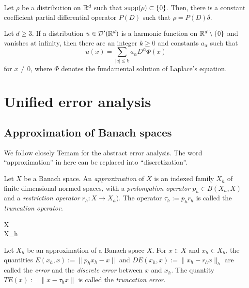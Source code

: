 \documentclass[a4paper]{article}
\begin{document}
\begin{lem*}
Let $\rho$ be a distribution on $\mathbb{R}^d$ such that $\operatorname{supp}(\rho)\subset\{0\}$.
Then, there is a constant coefficient partial differential operator $P(D)$ such that $\rho=P(D)\delta$.
\end{lem*}

\begin{cor*}
Let $d\ge3$.
If a distribution $u\in\mathcal{D}'(\mathbb{R}^d)$ is a harmonic function on $\mathbb{R}^d\setminus\{0\}$ and vanishes at infinity, then there are an integer $k\ge0$ and constants $a_\alpha$ such that
\[u(x)=\sum_{|a|\le k}a_\alpha D^\alpha\Phi(x)\]
for $x\ne0$, where $\Phi$ denotes the fundamental solution of Laplace's equation.
\end{cor*}




\newpage
\section{Unified error analysis}

\subsection{Approximation of Banach spaces}
We follow closely Temam for the abstract error analysis.
The word ``approximation'' in here can be replaced into ``discretization''.

\begin{defn}[Approximation]
Let $X$ be a Banach space.
An \emph{approximation} of $X$ is an indexed family $X_h$ of finite-dimensional normed spaces, with a \emph{prolongation operator} $p_h\in B(X_h,X)$ and a \emph{restriction operator} $r_h:X\to X_h)$.
The operator $\tau_h:=p_hr_h$ is called the \emph{truncation operator}.
\begin{cd}
X \\ X_h
\end{cd}
\end{defn}

\begin{defn}[Errors]
Let $X_h$ be an approximation of a Banach space $X$.
For $x\in X$ and $x_h\in X_h$, the quantities $E(x_h,x):=\|p_hx_h-x\|$ and $DE(x_h,x):=\|x_h-r_hx\|_h$ are called the \emph{error} and the \emph{discrete error} between $x$ and $x_h$.
The quantity $TE(x):=\|x-\tau_hx\|$ is called the \emph{truncation error}.
\end{defn}
\end{document}
